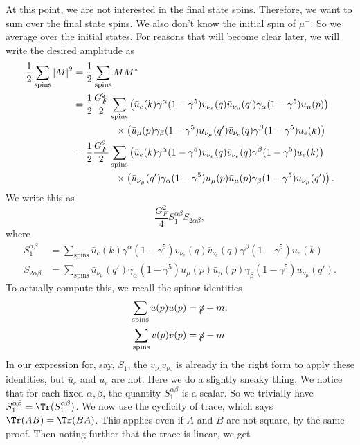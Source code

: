 \documentclass[a4paper]{article}
\begin{document}
At this point, we are not interested in the final state spins. Therefore, we want to sum over the final state spins. We also don't know the initial spin of $\mu^-$. So we average over the initial states. For reasons that will become clear later, we will write the desired amplitude as
\begin{align*}
  \frac{1}{2} \sum_{\mathrm{spins}} |M|^2 &= \frac{1}{2} \sum_{\mathrm{spins}} MM^*\\
  &= \frac{1}{2} \frac{G_F^2}{2} \sum_{\mathrm{spins}} \left(\bar{u}_e(k) \gamma^\alpha (1 - \gamma^5) v_{\nu_e}(q)\bar{u}_{\nu_\mu} (q') \gamma_\alpha (1 - \gamma^5) u_\mu(p)\right)\\
  &\hphantom{\frac{1}{2} \frac{G_F^2}{2}\sum_{\mathrm{spins}}}\times \left(\bar{u}_\mu (p) \gamma_\beta(1 - \gamma^5) u_{\nu_\mu}(q') \bar{v}_{\nu_e}(q) \gamma^\beta (1 - \gamma^5) u_e(k)\right)\\
  &= \frac{1}{2} \frac{G_F^2}{2} \sum_{\mathrm{spins}} \left(\bar{u}_e(k) \gamma^\alpha (1 - \gamma^5) v_{\nu_e}(q) \bar{v}_{\nu_e}(q) \gamma^\beta (1 - \gamma^5) u_e(k)\right)\\
  &\hphantom{\frac{1}{2} \frac{G_F^2}{2}\sum_{\mathrm{spins}}}\times \left(\bar{u}_{\nu_\mu} (q') \gamma_\alpha (1 - \gamma^5) u_\mu(p) \bar{u}_\mu (p) \gamma_\beta(1 - \gamma^5) u_{\nu_\mu}(q')\right).
\end{align*}
We write this as
\[
  \frac{G_F^2}{4} S_1^{\alpha\beta}S_{2\alpha\beta},
\]
where
\begin{align*}
  S_1^{\alpha\beta} &= \sum_{\mathrm{spins}} \bar{u}_e(k) \gamma^\alpha (1 - \gamma^5) v_{\nu_e}(q) \bar{v}_{\nu_e}(q) \gamma^\beta (1 - \gamma^5) u_e(k)\\
  S_{2\alpha\beta} &= \sum_{\mathrm{spins}}\bar{u}_{\nu_\mu} (q') \gamma_\alpha (1 - \gamma^5) u_\mu(p) \bar{u}_\mu (p) \gamma_\beta(1 - \gamma^5) u_{\nu_\mu}(q').
\end{align*}
To actually compute this, we recall the spinor identities
\begin{align*}
  \sum_{\mathrm{spins}} u(p) \bar{u}(p) &= \slashed{p} + m,\\
  \sum_{\mathrm{spins}} v(p) \bar{v}(p) &= \slashed{p} - m
\end{align*}
In our expression for, say, $S_1$, the $v_{\nu_e} \bar{v}_{\nu_e}$ is already in the right form to apply these identities, but $\bar{u}_e$ and $u_e$ are not. Here we do a slightly sneaky thing. We notice that for each fixed $\alpha, \beta$, the quantity $S^{\alpha\beta}_1$ is a scalar. So we trivially have $S_1^{\alpha\beta} = \Tr(S_1^{\alpha \beta})$. We now use the cyclicity of trace, which says $\Tr (AB) = \Tr (BA)$. This applies even if $A$ and $B$ are not square, by the same proof. Then noting further that the trace is linear, we get
\end{document}
